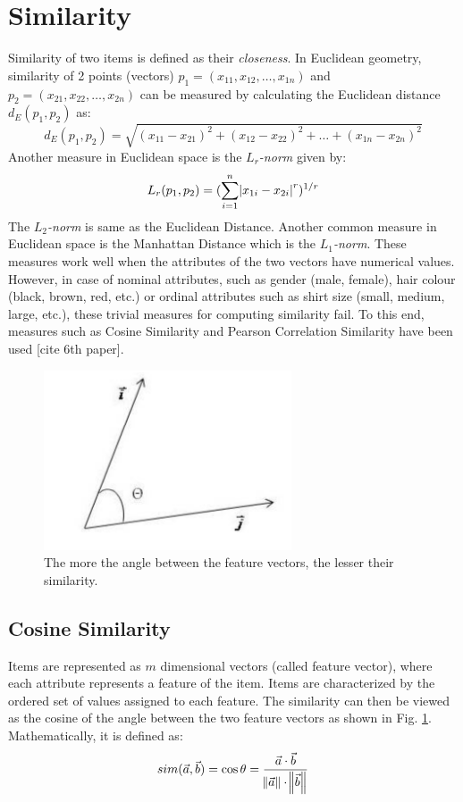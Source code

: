 \section{Similarity}
Similarity of two items is defined as their \textit{closeness}. In Euclidean geometry, similarity of 2 points (vectors) $p_1=(x_{11}, x_{12},\dots,x_{1n})$ and $p_2=(x_{21}, x_{22},\dots,x_{2n})$ can be measured by calculating the Euclidean distance $d_E(p_1,p_2)$ as:
\begin{equation}
d_E(p_1,p_2) = \sqrt{(x_{11}-x_{21})^2+(x_{12}-x_{22})^2+\dots +(x_{1n}-x_{2n})^2} \nonumber
\end{equation}
Another measure in Euclidean space is the \textit{$L_r$-norm} given by:
\begin{equation}
L_r(p_1,p_2) = (\displaystyle\sum_{i=1}^n \abs{x_{1i}-x_{2i}}^r)^{1/r}
\end{equation}
The \textit{$L_2$-norm} is same as the Euclidean Distance. Another common measure in Euclidean space is the Manhattan Distance which is the \textit{$L_1$-norm}. These measures work well when the attributes of the two vectors have numerical values. However, in case of nominal attributes, such as gender (male, female), hair colour (black, brown, red, etc.) or ordinal attributes such as shirt size (small, medium, large, etc.), these trivial measures for computing similarity fail. To this end, measures such as Cosine Similarity and Pearson Correlation Similarity have been used [cite 6th paper].

\begin{figure}[ht]
\centering
\includegraphics[height=0.35\columnwidth]{cosine}
\caption{The more the angle between the feature vectors, the lesser their similarity.}
\label{fig:cosine}
\end{figure}
\subsection{Cosine Similarity}
Items are represented as $m$ dimensional vectors (called feature vector), where each attribute represents a feature of the item. Items are characterized by the ordered set of values assigned to each feature. The similarity can then be viewed as the cosine of the angle between the two feature vectors as shown in Fig. \ref{fig:cosine}. Mathematically, it is defined as:
\begin{equation}
sim(\vec{a},\vec{b})=\cos\theta=\frac{\vec{a}\cdot\vec{b}}{\norm{\vec{a}}\cdot\norm{\vec{b}}}
\end{equation}

